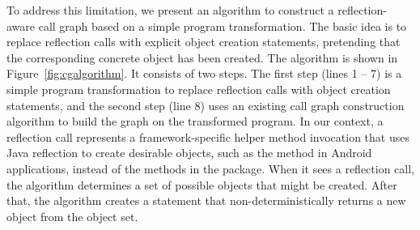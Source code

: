 

To address this limitation, we present an algorithm to construct
a reflection-aware call graph based on a simple program transformation.
The basic idea is to replace reflection calls with explicit object
creation statements, pretending that the corresponding concrete object
has been created.  The algorithm is shown in Figure~\ref{fig:cgalgorithm}.
It consists of two steps. The first step (lines 1 -- 7) is a simple program
transformation to replace reflection calls with object creation statements, and
the second step (line 8) uses an existing call graph construction algorithm
to build the graph on the transformed program. In our context,
a reflection call represents a framework-specific helper method invocation
that uses Java reflection to create desirable objects, such as
the  method in Android applications, instead
of the methods in the  package.
When it sees a reflection call, the algorithm
determines a set of possible objects that might be created.
After that, the algorithm creates a statement that non-deterministically
returns a new object from the object set.

